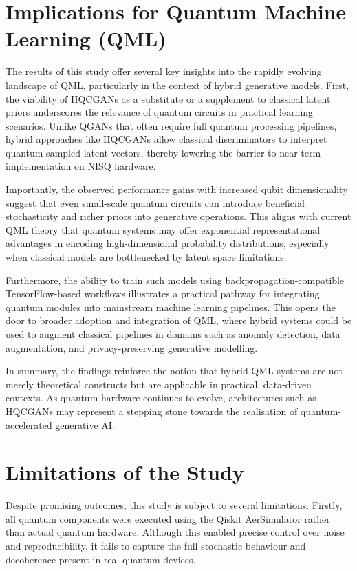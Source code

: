 \section{Implications for Quantum Machine Learning (QML)}

The results of this study offer several key insights into the rapidly evolving landscape of QML, particularly in the context of hybrid generative models. First, the viability of HQCGANs as a substitute or a supplement to classical latent priors underscores the relevance of quantum circuits in practical learning scenarios. Unlike QGANs that often require full quantum processing pipelines, hybrid approaches like HQCGANs allow classical discriminators to interpret quantum-sampled latent vectors, thereby lowering the barrier to near-term implementation on NISQ hardware.

Importantly, the observed performance gains with increased qubit dimensionality suggest that even small-scale quantum circuits can introduce beneficial stochasticity and richer priors into generative operations. This aligns with current QML theory that quantum systems may offer exponential representational advantages in encoding high-dimensional probability distributions, especially when classical models are bottlenecked by latent space limitations.

Furthermore, the ability to train such models using backpropagation-compatible TensorFlow-based workflows illustrates a practical pathway for integrating quantum modules into mainstream machine learning pipelines. This opens the door to broader adoption and integration of QML, where hybrid systems could be used to augment classical pipelines in domains such as anomaly detection, data augmentation, and privacy-preserving generative modelling.

In summary, the findings reinforce the notion that hybrid QML systems are not merely theoretical constructs but are applicable in practical, data-driven contexts. As quantum hardware continues to evolve, architectures such as HQCGANs may represent a stepping stone towards the realisation of quantum-accelerated generative AI.

\section{Limitations of the Study}

Despite promising outcomes, this study is subject to several limitations. Firstly, all quantum components were executed using the Qiskit AerSimulator rather than actual quantum hardware. Although this enabled precise control over noise and reproducibility, it fails to capture the full stochastic behaviour and decoherence present in real quantum devices.

